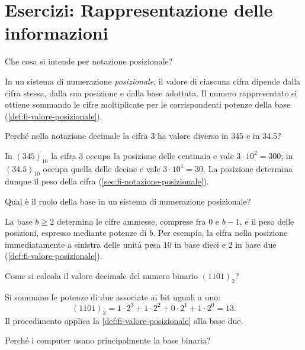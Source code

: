 \chapter{Esercizi: Rappresentazione delle informazioni}
\label{chap:esercizi-rappresentazione-informazioni}

\begin{exercise}
\label{ex:fi-rappresentazione-notazione-posizionale}
Che cosa si intende per notazione posizionale?
\end{exercise}

In un sistema di numerazione \emph{posizionale}, il valore di ciascuna
cifra dipende dalla cifra stessa, dalla sua posizione e dalla base
adottata. Il numero rappresentato si ottiene sommando le cifre
moltiplicate per le corrispondenti potenze della base
(\cref{def:fi-valore-posizionale}).

\begin{exercise}
\label{ex:fi-rappresentazione-valore-cifra-tre}
Perché nella notazione decimale la cifra 3 ha valore diverso in 345
e in 34.5?
\end{exercise}

In \((345)_{10}\) la cifra \(3\) occupa la posizione delle centinaia
e vale \(3\cdot10^2=300\); in \((34.5)_{10}\) occupa quella delle
decine e vale \(3\cdot10^1=30\). La posizione determina dunque il
peso della cifra (\cref{sec:fi-notazione-posizionale}).

\begin{exercise}
\label{ex:fi-rappresentazione-ruolo-base}
Qual è il ruolo della base in un sistema di numerazione posizionale?
\end{exercise}

La base \(b\ge2\) determina le cifre ammesse, comprese fra \(0\) e
\(b-1\), e il peso delle posizioni, espresso mediante potenze di \(b\).
Per esempio, la cifra nella posizione immediatamente a sinistra delle
unità pesa \(10\) in base dieci e \(2\) in base due
(\cref{def:fi-valore-posizionale}).

\begin{exercise}
\label{ex:fi-rappresentazione-binario-1101}
Come si calcola il valore decimale del numero binario \((1101)_2\)?
\end{exercise}

Si sommano le potenze di due associate ai bit uguali a uno:
\[
  (1101)_2=1\cdot2^3+1\cdot2^2+0\cdot2^1+1\cdot2^0=13.
\]
Il procedimento applica la \cref{def:fi-valore-posizionale}
alla base due.

\begin{exercise}
\label{ex:fi-rappresentazione-motivo-base-binaria}
Perché i computer usano principalmente la base binaria?
\end{exercise}

